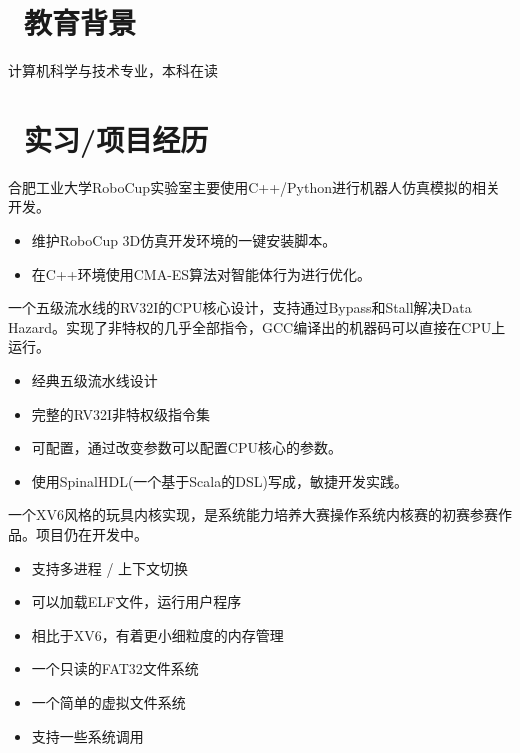 \documentclass{resume}
\begin{document}


 
\section{\faGraduationCap\  教育背景}
计算机科学与技术专业，本科在读

\section{\faUsers\ 实习/项目经历}
\role{3D仿真开发小组成员}{}
\begin{onehalfspacing}
合肥工业大学RoboCup实验室主要使用C++/Python进行机器人仿真模拟的相关开发。
\begin{itemize}
  \item 维护RoboCup 3D仿真开发环境的一键安装脚本。
  \item 在C++环境使用CMA-ES算法对智能体行为进行优化。
\end{itemize}
\end{onehalfspacing}

\begin{onehalfspacing}
一个五级流水线的RV32I的CPU核心设计，支持通过Bypass和Stall解决Data Hazard。实现了非特权的几乎全部指令，GCC编译出的机器码可以直接在CPU上运行。
\begin{itemize}
  \item 经典五级流水线设计
  \item 完整的RV32I非特权级指令集
  \item 可配置，通过改变参数可以配置CPU核心的参数。
  \item 使用SpinalHDL(一个基于Scala的DSL)写成，敏捷开发实践。
\end{itemize}
\end{onehalfspacing}

\begin{onehalfspacing}
一个XV6风格的玩具内核实现，是系统能力培养大赛操作系统内核赛的初赛参赛作品。项目仍在开发中。
\begin{itemize}
  \item 支持多进程 / 上下文切换
  \item 可以加载ELF文件，运行用户程序
  \item 相比于XV6，有着更小细粒度的内存管理
  \item 一个只读的FAT32文件系统
  \item 一个简单的虚拟文件系统
  \item 支持一些系统调用
\end{itemize}
\end{onehalfspacing}
\end{document}
